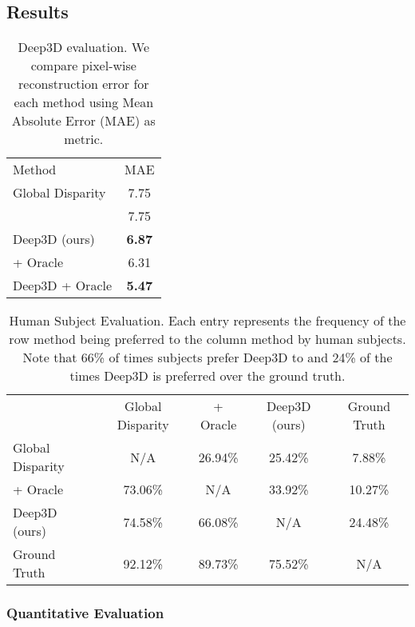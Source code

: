\documentclass[runningheads]{llncs}
\begin{document}
\subsection{Results}\begin{table}[!ht]
\begin{center}
\caption{Deep3D evaluation. We compare pixel-wise reconstruction error for each method using Mean Absolute Error (MAE) as metric.}
\label{table:objeval}
\begin{tabular}{lc}
\hline\noalign{\smallskip}
Method & MAE\\
\noalign{\smallskip}
\hline
\noalign{\smallskip}
Global Disparity                             & 7.75\\
\cite{eigen2014depth}                        & 7.75\\
Deep3D (ours)                                & \textbf{6.87}\\
\hline
\cite{eigen2014depth} + Oracle \hspace{0.8in}               & 6.31\\
Deep3D + Oracle                              & \textbf{5.47}\\
\hline
\end{tabular}
\end{center}
\end{table}\begin{table}[t]
\begin{center}
\caption{Human Subject Evaluation. Each entry represents the frequency of the row method being preferred to the column method by human subjects.
Note that 66\% of times subjects prefer Deep3D to \cite{eigen2014depth} and 24\% of the times Deep3D is preferred over the ground truth.}
\label{table:subjeval}
\begin{tabular}{l|c|c|c|c}
\hline\noalign{\smallskip}
  & Global Disparity & \cite{eigen2014depth} + Oracle & Deep3D (ours) & Ground Truth\\
\noalign{\smallskip}
\hline
\noalign{\smallskip}
Global Disparity                    &   N/A &   26.94\% &   25.42\% &   7.88\%  \\
\cite{eigen2014depth} + Oracle      &   73.06\% &   N/A &   33.92\% &   10.27\% \\
Deep3D (ours)                       &   74.58\% &   66.08\% &   N/A &   24.48\% \\
Ground Truth                        &   92.12\% &   89.73\% &   75.52\% &   N/A \\
\hline
\end{tabular}
\end{center}
\end{table}\subsubsection{Quantitative Evaluation}%
\end{document}
